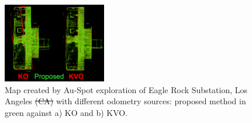 \documentclass[letterpaper, 10pt, conference]{ieeeconf}      %
\newcommand{\inst}[1]{{\color{orange} #1 }} %
\newcommand{\rev}[1]{{\color{blue} #1 }} %
\begin{document}







\begin{figure}[t!]
  \centering
  \includegraphics[width=0.4\textwidth]{spot_iros/graphics/spot_eagle_rock_shrinked_black.png}
  \caption{Map created by Au-Spot exploration of Eagle Rock Substation, Los Angeles \rev{\st{(CA)}} with different odometry sources: proposed method in green against a) KO and b) KVO.}
  \label{spot_eagle_rock}
\end{figure}
\end{document}

